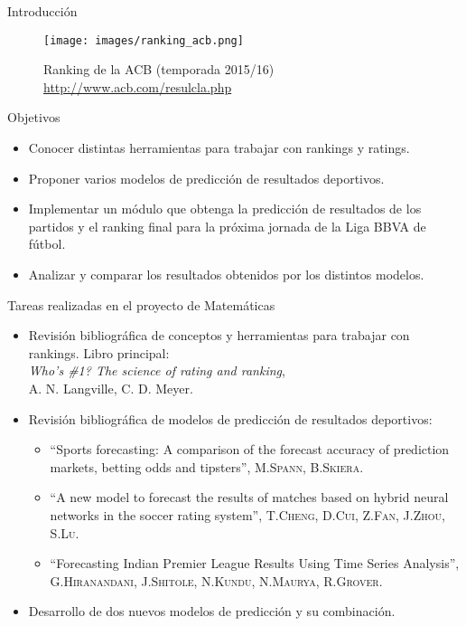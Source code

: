 \documentclass{beamer}
\begin{document}
	\begin{frame}{Introducción}
		\begin{figure}
			\centering
			\texttt{[image: images/ranking\_acb.png]}
			\caption{Ranking de la ACB (temporada 2015/16) \url{http://www.acb.com/resulcla.php}}
		\end{figure}
	\end{frame}

	\begin{frame}{Objetivos}
		\begin{itemize}
			\item Conocer distintas herramientas para trabajar con rankings y ratings.			
			\item Proponer varios modelos de predicción de resultados deportivos.
			\item Implementar un módulo que obtenga la predicción de resultados de los partidos y el ranking final para la próxima jornada de la Liga BBVA de fútbol.  
			\item Analizar y comparar los resultados obtenidos por los distintos modelos.
		\end{itemize}
	\end{frame}
	
	\begin{frame}{Tareas realizadas en el proyecto de Matemáticas}
	\begin{itemize}
		\item Revisión bibliográfica de conceptos y herramientas para trabajar con rankings. Libro principal:\\
		 \textit{Who's \#1? The science of rating and ranking},\\ 
		 A. N. Langville, C. D. Meyer.
		\item Revisión bibliográfica de modelos de predicción de resultados deportivos: \\
		\begin{itemize}
			\item ``Sports forecasting: A comparison of the forecast accuracy of prediction markets, betting odds and tipsters'', \textsc{M.Spann, B.Skiera}.
			\item ``A new model to forecast the results of matches based on hybrid neural networks in the soccer rating system'', \textsc{T.Cheng, D.Cui, Z.Fan, J.Zhou, S.Lu}.
			\item ``Forecasting Indian Premier League Results Using Time Series Analysis'', \textsc{G.Hiranandani, J.Shitole, N.Kundu, N.Maurya, R.Grover}.
		\end{itemize}
		\item Desarrollo de dos nuevos modelos de predicción y su combinación.
	\end{itemize}
	\end{frame}
\end{document}
